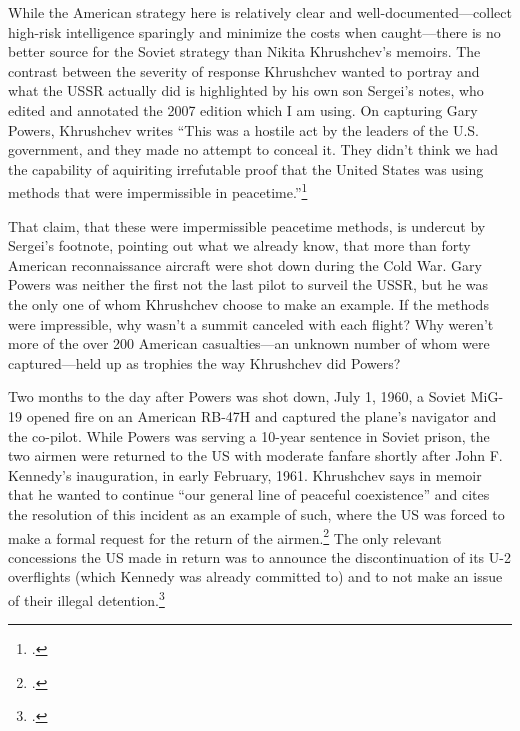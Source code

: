 \documentclass[12pt]{article}
\begin{document}
While the American strategy here is relatively clear and well-documented---collect high-risk intelligence sparingly and minimize the costs when caught---there is no better source for the Soviet strategy than Nikita Khrushchev's memoirs. The contrast between the severity of response Khrushchev wanted to portray and what the USSR actually did is highlighted by his own son Sergei's notes, who edited and annotated the 2007 edition which I am using.  On capturing Gary Powers, Khrushchev writes ``This was a hostile act by the leaders of the U.S. government, and they made no attempt to conceal it. They didn't think we had the capability of \textelp{} aquiriting irrefutable proof that the United States was using methods that were impermissible in peacetime.''\footcite[p.~239]{khrushchev_memoirs_2007}

That claim, that these were impermissible peacetime methods, is undercut by Sergei's footnote, pointing out what we already know, that more than forty American reconnaissance aircraft were shot down during the Cold War. Gary Powers was neither the first not the last pilot to surveil the USSR, but he was the only one of whom Khrushchev choose to make an example. If the methods were impressible, why wasn't a summit canceled with each flight?  Why weren't more of the over 200 American casualties---an unknown number of whom were captured---held up as trophies the way Khrushchev did Powers?

Two months to the day after Powers was shot down, July 1, 1960, a Soviet MiG-19 opened fire on an American RB-47H and captured the plane's navigator and the co-pilot. While Powers was serving a 10-year sentence in Soviet prison, the two airmen were returned to the US with moderate fanfare shortly after John F. Kennedy's inauguration, in early February, 1961. Khrushchev says in memoir that he wanted to continue ``our general line of peaceful coexistence'' and cites the resolution of this incident as an example of such, where the US was forced to make a formal request for the return of the airmen.\footcite[p.~256-257]{khrushchev_memoirs_2007} The only relevant concessions the US made in return was to announce the discontinuation of its U-2 overflights (which Kennedy was already committed to) and to not make an issue of their illegal detention.\footcite{time_cold_1961}
\end{document}
